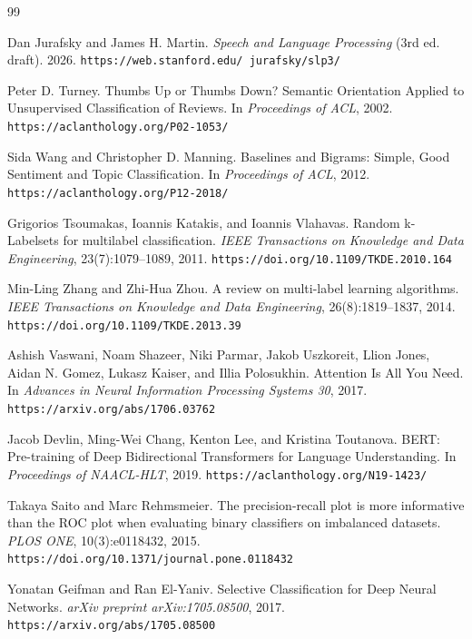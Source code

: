 \documentclass[12pt,a4paper]{article}
\begin{document}
\begin{thebibliography}{99}

Dan Jurafsky and James H. Martin.
\textit{Speech and Language Processing} (3rd ed. draft).
2026.
\newline\texttt{https://web.stanford.edu/~jurafsky/slp3/}

Peter D. Turney.
Thumbs Up or Thumbs Down? Semantic Orientation Applied to Unsupervised Classification of Reviews.
In \textit{Proceedings of ACL}, 2002.
\newline\texttt{https://aclanthology.org/P02-1053/}

Sida Wang and Christopher D. Manning.
Baselines and Bigrams: Simple, Good Sentiment and Topic Classification.
In \textit{Proceedings of ACL}, 2012.
\newline\texttt{https://aclanthology.org/P12-2018/}

Grigorios Tsoumakas, Ioannis Katakis, and Ioannis Vlahavas.
Random k-Labelsets for multilabel classification.
\textit{IEEE Transactions on Knowledge and Data Engineering}, 23(7):1079--1089, 2011.
\newline\texttt{https://doi.org/10.1109/TKDE.2010.164}

Min-Ling Zhang and Zhi-Hua Zhou.
A review on multi-label learning algorithms.
\textit{IEEE Transactions on Knowledge and Data Engineering}, 26(8):1819--1837, 2014.
\newline\texttt{https://doi.org/10.1109/TKDE.2013.39}

Ashish Vaswani, Noam Shazeer, Niki Parmar, Jakob Uszkoreit, Llion Jones, Aidan N. Gomez, Lukasz Kaiser, and Illia Polosukhin.
Attention Is All You Need.
In \textit{Advances in Neural Information Processing Systems 30}, 2017.
\newline\texttt{https://arxiv.org/abs/1706.03762}

Jacob Devlin, Ming-Wei Chang, Kenton Lee, and Kristina Toutanova.
BERT: Pre-training of Deep Bidirectional Transformers for Language Understanding.
In \textit{Proceedings of NAACL-HLT}, 2019.
\newline\texttt{https://aclanthology.org/N19-1423/}

Takaya Saito and Marc Rehmsmeier.
The precision-recall plot is more informative than the ROC plot when evaluating binary classifiers on imbalanced datasets.
\textit{PLOS ONE}, 10(3):e0118432, 2015.
\newline\texttt{https://doi.org/10.1371/journal.pone.0118432}

Yonatan Geifman and Ran El-Yaniv.
Selective Classification for Deep Neural Networks.
\textit{arXiv preprint arXiv:1705.08500}, 2017.
\newline\texttt{https://arxiv.org/abs/1705.08500}

\end{thebibliography}
\end{document}
